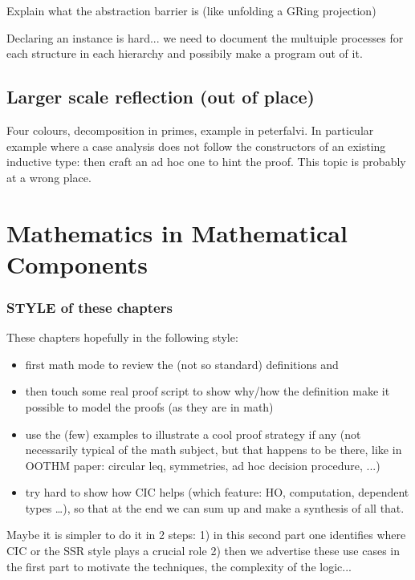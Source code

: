 \documentclass{book}
\begin{document}
Explain what the abstraction barrier is (like unfolding a GRing projection)



Declaring an instance is hard... we need to document the multuiple processes 
for each structure in each hierarchy and possibily make a program out of it.

\chapter{Larger scale reflection (out of place)}
Four colours, decomposition in primes, example in peterfalvi. In
particular example where a case analysis does not follow the
constructors of an existing inductive type: then craft an ad hoc one
to hint the proof. This topic is probably at a wrong place.

\part{Mathematics in Mathematical Components}

\section{STYLE of these chapters}
These chapters hopefully in the following style:
\begin{itemize}
\item first math mode to review the (not so standard) definitions and
\item then touch some real proof script to show why/how the definition
  make it possible to model the proofs (as they are in math)
\item use the (few) examples to illustrate a cool proof strategy if
  any (not necessarily typical of the math subject, but that happens to
  be there, like in OOTHM paper: circular leq, symmetries, ad hoc
  decision procedure, ...)
\item try hard to show how CIC helps (which feature: HO, computation, dependent
	types \ldots), so that at the end we can sum up and make a synthesis of
	all that.
\end{itemize}

Maybe it is simpler to do it in 2 steps:
1) in this second part one identifies where CIC or the SSR style plays a
   crucial role
2) then we advertise these use cases in the first part to motivate
   the techniques, the complexity of the logic...
\end{document}
